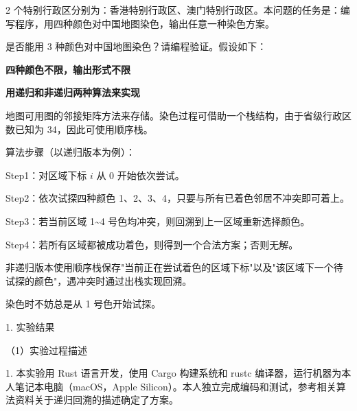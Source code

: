 \noindent\hspace*{2em}2 个特别行政区分别为：香港特别行政区、澳门特别行政区。本问题的任务是：编写程序，用四种颜色对中国地图染色，输出任意一种染色方案。\par
\noindent\hspace*{2em}是否能用 3 种颜色对中国地图染色？请编程验证。假设如下：\par
\noindent\hspace*{2em}\textbf{四种颜色不限，输出形式不限}\par
\noindent\hspace*{2em}\textbf{用递归和非递归两种算法来实现}\par
{}
\noindent\hspace*{2em}地图可用图的邻接矩阵方法来存储。染色过程可借助一个栈结构，由于省级行政区数已知为 34，因此可使用顺序栈。\par
\noindent\hspace*{2em}算法步骤（以递归版本为例）：\par
\noindent\hspace*{2em}Step1：对区域下标 $i$ 从 0 开始依次尝试。\par
\noindent\hspace*{2em}Step2：依次试探四种颜色 1、2、3、4，只要与所有已着色邻居不冲突即可着上。\par
\noindent\hspace*{2em}Step3：若当前区域 1\~{}4 号色均冲突，则回溯到上一区域重新选择颜色。\par
\noindent\hspace*{2em}Step4：若所有区域都被成功着色，则得到一个合法方案；否则无解。\par
\noindent\hspace*{2em}非递归版本使用顺序栈保存"当前正在尝试着色的区域下标"以及"该区域下一个待试探的颜色"，遇冲突时通过出栈实现回溯。\par
\noindent\hspace*{2em}染色时不妨总是从 1 号色开始试探。\par
{}
\noindent\hspace*{2em}1. 实验结果\par
\noindent\hspace*{2em}（1）实验过程描述\par
\noindent\hspace*{2em}1. 本实验用 Rust 语言开发，使用 Cargo 构建系统和 rustc 编译器，运行机器为本人笔记本电脑（macOS，Apple Silicon）。本人独立完成编码和测试，参考相关算法资料关于递归回溯的描述确定了方案。\par
